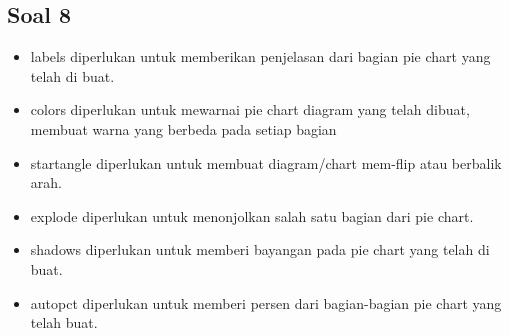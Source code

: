 	\subsection{Soal 8}
	\begin{itemize}
	\item labels diperlukan untuk memberikan penjelasan dari bagian pie chart yang telah di buat.
	\item colors diperlukan untuk mewarnai pie chart diagram yang telah dibuat, membuat warna yang 		   berbeda pada setiap bagian
	\item startangle diperlukan untuk membuat diagram/chart mem-flip atau berbalik arah.
	\item explode diperlukan untuk menonjolkan salah satu bagian dari pie chart.
	\item shadows diperlukan untuk memberi bayangan pada pie chart yang telah di buat.
	\item autopct diperlukan untuk memberi persen dari bagian-bagian pie chart yang telah buat.
	\end{itemize}


